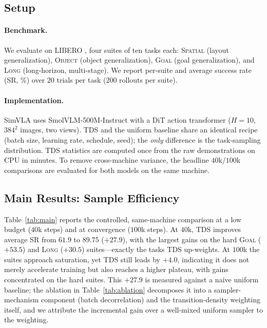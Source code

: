 \documentclass[letterpaper]{article} %
\newcommand{\tds}{TDS}
\begin{document}
\subsection{Setup}
\paragraph{Benchmark.}
We evaluate on LIBERO \citep{liu2023libero}, four suites of ten tasks each: \textsc{Spatial} (layout generalization), \textsc{Object} (object generalization), \textsc{Goal} (goal generalization), and \textsc{Long} (long-horizon, multi-stage). We report per-suite and average success rate (SR, \%) over $20$ trials per task ($200$ rollouts per suite).
\paragraph{Implementation.}
SimVLA uses SmolVLM-500M-Instruct \citep{marafioti2025smolvlm} with a DiT action transformer ($H{=}10$, $384^2$ images, two views). \tds{} and the uniform baseline share an identical recipe (batch size, learning rate, schedule, seed); the \emph{only} difference is the task-sampling distribution. \tds{} statistics are computed once from the raw demonstrations on CPU in minutes. To remove cross-machine variance, the headline $40$k/$100$k comparisons are evaluated for both models on the same machine.

\subsection{Main Results: Sample Efficiency}
Table~\ref{tab:main} reports the controlled, same-machine comparison at a low budget ($40$k steps) and at convergence ($100$k steps). At $40$k, \tds{} improves average SR from $61.9$ to $89.75$ ($+27.9$), with the largest gains on the hard \textsc{Goal} ($+53.5$) and \textsc{Long} ($+30.5$) suites---exactly the tasks \tds{} up-weights. At $100$k the suites approach saturation, yet \tds{} still leads by $+4.0$, indicating it does not merely accelerate training but also reaches a higher plateau, with gains concentrated on the hard suites. This $+27.9$ is measured against a naive uniform baseline; the ablation in Table~\ref{tab:ablation} decomposes it into a sampler-mechanism component (batch decorrelation) and the transition-density weighting itself, and we attribute the incremental gain over a well-mixed uniform sampler to the weighting.
\end{document}
